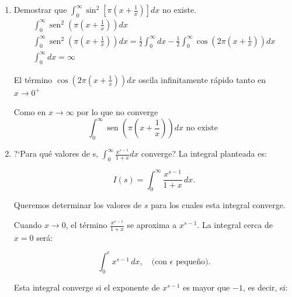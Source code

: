 \documentclass{article}
\begin{document}
\begin{enumerate}
Para \(x \to 0\), \((x^2 + a^2)^n \approx a^{2n}\), que es una constante. Por lo tanto, la integral no tiene problemas de convergencia en el origen.


La integral es convergente para \(n > \frac{1}{2}\).

\(\int_{0}^{\infty} x^{n} e^{-x} \, dx\)


La integral
\[
\int_{0}^{\infty} x^{n} e^{-x} \, dx
\]

La integral converge para \(n > -1\). Esto se debe a que el término \(e^{-x}\) asegura convergencia en el infinito, mientras que la condición \(n > -1\) asegura que no haya problemas de divergencia en el origen.


La integral es convergente para \(n > -1\).
	\item Demostrar que $ \int_{0}^{\infty}\sin^2[\pi(x+\frac{1}{x})]dx $ no existe.
    $$
\begin{gathered}
\int_0^{\infty} \operatorname{sen}^2\left(\pi\left(x+\frac{1}{x}\right)\right) d x \\
\int_0^{\infty} \operatorname{sen}^2\left(\pi\left(x+\frac{1}{x}\right)\right) d x=\frac{1}{2} \int_0^{\infty} d x-\frac{1}{2} \int_0^{\infty} \cos \left(2 \pi\left(x+\frac{1}{x}\right)\right) d x \\
\int_0^{\infty} d x=\infty
\end{gathered}
$$

El término $\cos \left(2 \pi\left(x+\frac{1}{x}\right)\right) d x$ oscila infinitamente rápido tanto en $x \rightarrow 0^{+}$

Como en $x \rightarrow \infty$ por lo que no converge
$$
\int_0^{\infty} \operatorname{sen}\left(\pi\left(x+\frac{1}{x}\right)\right) d x \text { no existe }
$$
	
	\item ?`Para qu\'e valores de s, $ \int_{0}^{\infty}\frac{x^{s-1}}{1+x}dx $ converge?
    La integral planteada es:

\[
I(s) = \int_0^\infty \frac{x^{s-1}}{1+x} \, dx.
\]

Queremos determinar los valores de \(s\) para los cuales esta integral converge.


Cuando \(x \to 0\), el término \(\frac{x^{s-1}}{1+x}\) se aproxima a \(x^{s-1}\). La integral cerca de \(x = 0\) será:

\[
\int_0^\epsilon x^{s-1} \, dx, \quad \text{(con \(\epsilon\) pequeño)}.
\]

Esta integral converge si el exponente de \(x^{s-1}\) es mayor que \(-1\), es decir, si:


\end{enumerate}
\end{document}
